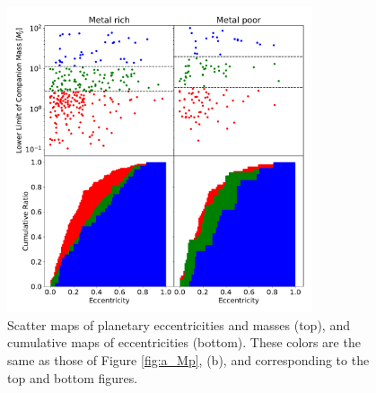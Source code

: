 \documentclass[twocolumn, dvipdfmx]{aastex62}
\begin{document}
\begin{CJK*}{UTF8}{min}
\begin{figure}[H]
\begin{center}
\includegraphics[width=9cm]{../../../Figure/e_Mp_merge.pdf}
\caption{Scatter maps of planetary eccentricities and masses (top), and cumulative maps of eccentricities (bottom). These colors are the same as those of Figure \ref{fig:a_Mp}, (b), and corresponding to the top and bottom figures. \label{fig:e_Mp}}
\end{center}
\end{figure}


\acknowledgments


\vspace{5mm}


\begin{thebibliography}{}


\end{thebibliography}
\end{CJK*}
\end{document}
